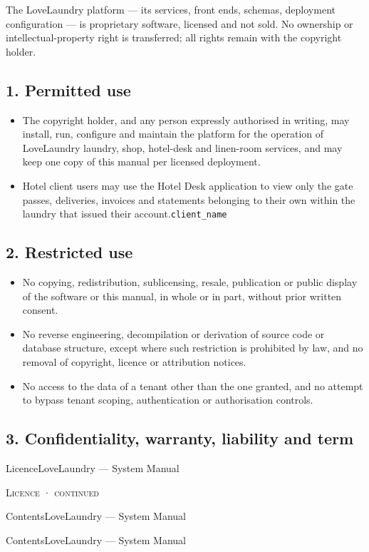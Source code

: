 \documentclass[11pt,a4paper,oneside]{book}
\begin{document}
The LoveLaundry platform — its services, front ends, schemas, deployment configuration — is proprietary software, licensed and not sold. No ownership or intellectual-property right is transferred; all rights remain with the copyright holder.

\subsection*{1. Permitted use}
\begin{itemize}
\item The copyright holder, and any person expressly authorised in writing, may install, run, configure and maintain the platform for the operation of LoveLaundry laundry, shop, hotel-desk and linen-room services, and may keep one copy of this manual per licensed deployment.
\item Hotel client users may use the Hotel Desk application to view only the gate passes, deliveries, invoices and statements belonging to their own  within the laundry that issued their account.\texttt{client\_name}
\end{itemize}
\subsection*{2. Restricted use}
\begin{itemize}
\item No copying, redistribution, sublicensing, resale, publication or public display of the software or this manual, in whole or in part, without prior written consent.
\item No reverse engineering, decompilation or derivation of source code or database structure, except where such restriction is prohibited by law, and no removal of copyright, licence or attribution notices.
\item No access to the data of a tenant other than the one granted, and no attempt to bypass tenant scoping, authentication or authorisation controls.
\end{itemize}
\subsection*{3. Confidentiality, warranty, liability and term}
LicenceLoveLaundry — System Manual

\textsc{\small\color{crimson}Licence · continued}\par\medskip
ContentsLoveLaundry — System Manual

ContentsLoveLaundry — System Manual
\end{document}
